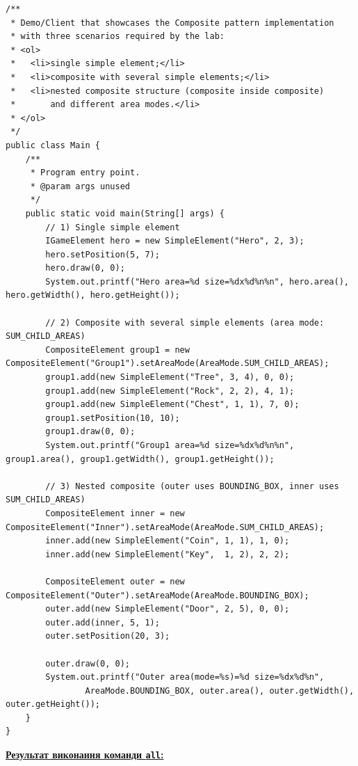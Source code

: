 \documentclass[12pt,a4paper]{article}
\begin{document}
    \begin{verbatim}
/**
 * Demo/Client that showcases the Composite pattern implementation
 * with three scenarios required by the lab:
 * <ol>
 *   <li>single simple element;</li>
 *   <li>composite with several simple elements;</li>
 *   <li>nested composite structure (composite inside composite)
 *       and different area modes.</li>
 * </ol>
 */
public class Main {
    /**
     * Program entry point.
     * @param args unused
     */
    public static void main(String[] args) {
        // 1) Single simple element
        IGameElement hero = new SimpleElement("Hero", 2, 3);
        hero.setPosition(5, 7);
        hero.draw(0, 0);
        System.out.printf("Hero area=%d size=%dx%d%n%n", hero.area(), hero.getWidth(), hero.getHeight());

        // 2) Composite with several simple elements (area mode: SUM_CHILD_AREAS)
        CompositeElement group1 = new CompositeElement("Group1").setAreaMode(AreaMode.SUM_CHILD_AREAS);
        group1.add(new SimpleElement("Tree", 3, 4), 0, 0);
        group1.add(new SimpleElement("Rock", 2, 2), 4, 1);
        group1.add(new SimpleElement("Chest", 1, 1), 7, 0);
        group1.setPosition(10, 10);
        group1.draw(0, 0);
        System.out.printf("Group1 area=%d size=%dx%d%n%n", group1.area(), group1.getWidth(), group1.getHeight());

        // 3) Nested composite (outer uses BOUNDING_BOX, inner uses SUM_CHILD_AREAS)
        CompositeElement inner = new CompositeElement("Inner").setAreaMode(AreaMode.SUM_CHILD_AREAS);
        inner.add(new SimpleElement("Coin", 1, 1), 1, 0);
        inner.add(new SimpleElement("Key",  1, 2), 2, 2);

        CompositeElement outer = new CompositeElement("Outer").setAreaMode(AreaMode.BOUNDING_BOX);
        outer.add(new SimpleElement("Door", 2, 5), 0, 0);
        outer.add(inner, 5, 1);
        outer.setPosition(20, 3);

        outer.draw(0, 0);
        System.out.printf("Outer area(mode=%s)=%d size=%dx%d%n",
                AreaMode.BOUNDING_BOX, outer.area(), outer.getWidth(), outer.getHeight());
    }
}
    \end{verbatim}

    \textbf{\underline{Результат виконання команди \texttt{all}:}}
\end{document}
